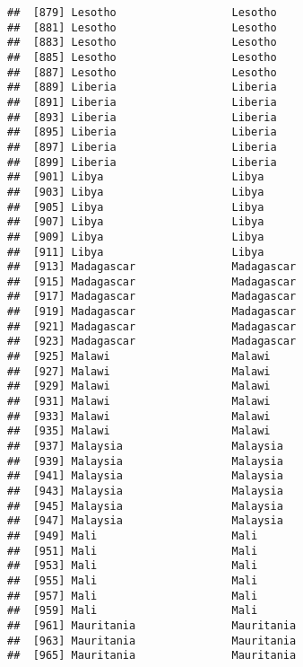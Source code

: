 \documentclass[]{article}
\begin{document}
\begin{verbatim}
##  [879] Lesotho                  Lesotho                 
##  [881] Lesotho                  Lesotho                 
##  [883] Lesotho                  Lesotho                 
##  [885] Lesotho                  Lesotho                 
##  [887] Lesotho                  Lesotho                 
##  [889] Liberia                  Liberia                 
##  [891] Liberia                  Liberia                 
##  [893] Liberia                  Liberia                 
##  [895] Liberia                  Liberia                 
##  [897] Liberia                  Liberia                 
##  [899] Liberia                  Liberia                 
##  [901] Libya                    Libya                   
##  [903] Libya                    Libya                   
##  [905] Libya                    Libya                   
##  [907] Libya                    Libya                   
##  [909] Libya                    Libya                   
##  [911] Libya                    Libya                   
##  [913] Madagascar               Madagascar              
##  [915] Madagascar               Madagascar              
##  [917] Madagascar               Madagascar              
##  [919] Madagascar               Madagascar              
##  [921] Madagascar               Madagascar              
##  [923] Madagascar               Madagascar              
##  [925] Malawi                   Malawi                  
##  [927] Malawi                   Malawi                  
##  [929] Malawi                   Malawi                  
##  [931] Malawi                   Malawi                  
##  [933] Malawi                   Malawi                  
##  [935] Malawi                   Malawi                  
##  [937] Malaysia                 Malaysia                
##  [939] Malaysia                 Malaysia                
##  [941] Malaysia                 Malaysia                
##  [943] Malaysia                 Malaysia                
##  [945] Malaysia                 Malaysia                
##  [947] Malaysia                 Malaysia                
##  [949] Mali                     Mali                    
##  [951] Mali                     Mali                    
##  [953] Mali                     Mali                    
##  [955] Mali                     Mali                    
##  [957] Mali                     Mali                    
##  [959] Mali                     Mali                    
##  [961] Mauritania               Mauritania              
##  [963] Mauritania               Mauritania              
##  [965] Mauritania               Mauritania              

\end{verbatim}
\end{document}
